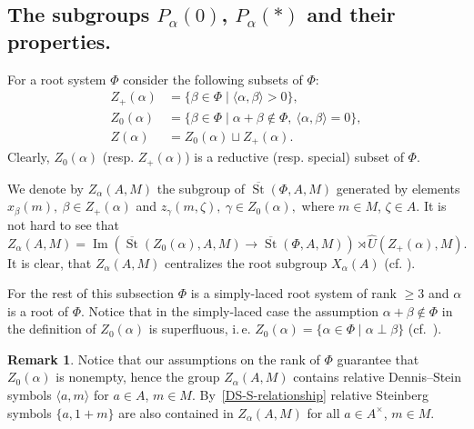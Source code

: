 \documentclass[oneside, 8pt]{amsart}
\theoremstyle{remark}
\theoremstyle{definition}
\newtheorem{rem}[lemma]{Remark}
\DeclareMathOperator{\Img}{Im}
\DeclareMathOperator{\St}{St}
\numberwithin{equation}{section}
\begin{document}
\subsection{The subgroups \texorpdfstring{$P_\alpha(0)$}{Pa(0)}, \texorpdfstring{$P_\alpha(*)$}{Pa(*)} and their properties.} 
For a root system $\Phi$ consider the following subsets of $\Phi$:
\begin{align} Z_+(\alpha) & = \{ \beta \in \Phi \mid \langle \alpha, \beta \rangle > 0 \}, \\
   Z_0(\alpha) & = \{ \beta \in \Phi \mid \alpha + \beta \not\in \Phi,\ \langle \alpha, \beta \rangle = 0 \}, \\
   Z(\alpha)   & = Z_0(\alpha) \sqcup Z_+(\alpha). \end{align} 
Clearly, $Z_0(\alpha)$ (resp. $Z_+(\alpha)$) is a reductive (resp. special) subset of $\Phi$.
   
We denote by $Z_\alpha(A, M)$ the subgroup of $\overline{\St}(\Phi, A, M)$ generated by elements
 $x_{\beta}(m),\ \beta \in Z_+(\alpha)$ and $z_{\gamma}(m, \zeta),\ \gamma \in Z_0(\alpha),$ where $m \in M$, $\zeta \in A$.
It is not hard to see that \[Z_\alpha(A, M) = \Img\left(\overline{\St}(Z_0(\alpha), A, M) \to \overline{\St}(\Phi, A, M)\right) \rtimes \hat{U}(Z_+(\alpha), M). \]
It is clear, that $Z_\alpha(A, M)$ centralizes the root subgroup $X_\alpha(A)$ (cf. \cite[984]{St71}).

For the rest of this subsection $\Phi$ is a simply-laced root system of rank $\geq 3$ and $\alpha$ is a root of $\Phi$. Notice that in the simply-laced case the assumption $\alpha+\beta\not\in \Phi$ in the definition of $Z_0(\alpha)$ is superfluous, i.\,e. $Z_0(\alpha) = \{ \alpha\in\Phi \mid \alpha \perp \beta \}$
(cf.~\cite[Proposition~5.7]{St71}).

\begin{rem}\label{Z-DS} Notice that our assumptions on the rank of $\Phi$ guarantee that $Z_0(\alpha)$ is nonempty, hence the group $Z_\alpha(A, M)$ contains relative Dennis--Stein symbols $\langle a, m \rangle$ for $a\in A$, $m\in M$.
By~\eqref{DS-S-relationship} relative Steinberg symbols $\{a, 1+m\}$ are also contained in $Z_\alpha(A, M)$ for all $a\in A^\times$, $m\in M$. \end{rem}
\end{document}

